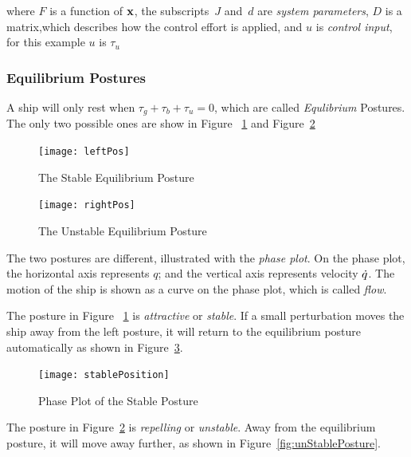 where 
$F$ is a function of $\mathbf{x}$, the subscripts~$J$ and~$d$ are \emph{system parameters},
$D$ is a matrix,which describes how the control effort is applied,
and $u$ is \emph{control input}, for this example $u$ is $\tau_{u}$



\subsubsection*{Equilibrium Postures}
A ship will only rest when $\tau_{g}+\tau_{b}+\tau_{u}=0$, which are called \emph{Equlibrium} Postures.
The only two possible ones are show in Figure ~\ref{fig:ShipEqulibriumStable} and Figure~\ref{fig:ShipEqulibriumUnstable}
\begin{figure}[!htbp]
  \begin{center}
     \texttt{[image: leftPos]}
    \caption{The Stable Equilibrium Posture}
    \label{fig:ShipEqulibriumStable}
  \end{center}
\end{figure}

\begin{figure}[!htbp]
  \begin{center}
     \texttt{[image: rightPos]}
    \caption{The Unstable Equilibrium Posture}
    \label{fig:ShipEqulibriumUnstable}
  \end{center}
\end{figure}



The two postures are different, illustrated with the \emph{phase plot}.
On the phase plot, the horizontal axis represents  $q$; and the vertical axis represents velocity $\dot{q}$. 
The motion of the ship is shown as a curve on the phase plot, which is called \emph{flow}.

The posture in Figure ~\ref{fig:ShipEqulibriumStable} is \emph{attractive} or \emph{stable}.
If a small perturbation moves the ship away from the left posture, it will return to the equilibrium posture automatically as shown in Figure~\ref{fig:StablePosture}.
\begin{figure}[!htbp]
  \begin{center}
      \texttt{[image: stablePosition]}
    \caption{Phase Plot of the Stable Posture}
    \label{fig:StablePosture}
  \end{center}
\end{figure}


The  posture in Figure~\ref{fig:ShipEqulibriumUnstable} is \emph{repelling} or \emph{unstable}.
Away from the equilibrium posture, it will move away further, as shown in Figure~\ref{fig:unStablePosture}.

